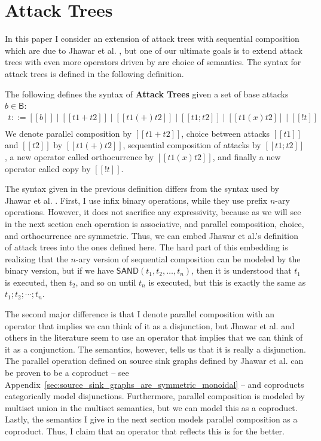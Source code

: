 \documentclass{llncs}
\begin{document}
\section{Attack Trees}
\label{sec:attack_trees}
In this paper I consider an extension of attack trees with sequential
composition which are due to Jhawar et al. \cite{Jhawar:2015}, but one
of our ultimate goals is to extend attack trees with even more
operators driven by are choice of semantics.  The syntax for attack
trees is defined in the following definition.
\begin{definition}
  \label{def:atrees}
  The following defines the syntax of \textbf{Attack Trees} given a set
  of base attacks $b \in \mathsf{B}$:
  \[
  \begin{array}{lll}
    t ::= [[b]] \mid [[t1 + t2]] \mid [[t1 (+) t2]] \mid [[t1;t2]] \mid [[t1 (x) t2]] \mid [[! t ]]\\
  \end{array}
  \]
  We denote parallel composition by $[[t1 + t2]]$, choice between
  attacks $[[t1]]$ and $[[t2]]$ by $[[t1 (+) t2]]$, sequential
  composition of attacks by $[[t1;t2]]$, a new operator called
  orthocurrence by $[[t1 (x) t2]]$, and finally a new operator called
  copy by $[[! t]]$.
\end{definition}
The syntax given in the previous definition differs from the syntax
used by Jhawar et al. \cite{Jhawar:2015}.  First, I use infix binary
operations, while they use prefix $n$-ary operations. However, it does
not sacrifice any expressivity, because as we will see in the next
section each operation is associative, and parallel composition,
choice, and orthocurrence are symmetric.  Thus, we can embed Jhawar et
al.'s definition of attack trees into the ones defined here.  The hard
part of this embedding is realizing that the $n$-ary version of
sequential composition can be modeled by the binary version, but if we
have $\mathsf{SAND}(t_1,t_2,\ldots,t_n)$, then it is understood that
$t_1$ is executed, then $t_2$, and so on until $t_n$ is executed, but
this is exactly the same as $t_1;t_2;\cdots;t_n$.

The second major difference is that I denote parallel composition with
an operator that implies we can think of it as a disjunction, but
Jhawar et al. and others in the literature seem to use an operator
that implies that we can think of it as a conjunction.  The semantics,
however, tells us that it is really a disjunction.  The parallel
operation defined on source sink graphs defined by Jhawar et
al. \cite{Jhawar:2015} can be proven to be a coproduct -- see
Appendix~\ref{sec:source_sink_graphs_are_symmetric_monoidal} -- and
coproducts categorically model disjunctions.  Furthermore, parallel
composition is modeled by multiset union in the multiset semantics,
but we can model this as a coproduct.  Lastly, the semantics I give in
the next section models parallel composition as a coproduct.  Thus, I
claim that an operator that reflects this is for the better.
\end{document}
